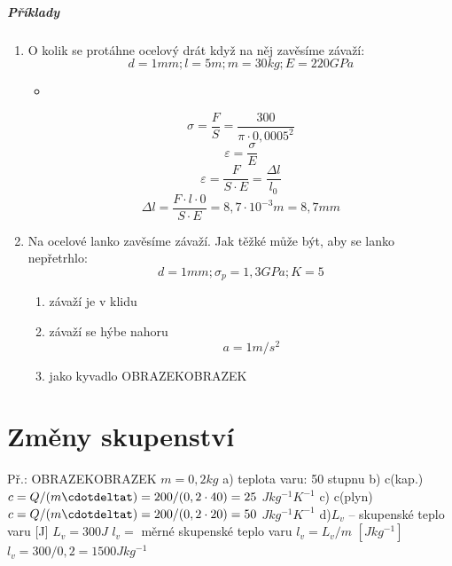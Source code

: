 \documentclass{article}
\begin{document}
        \subsubsection{Příklady}
        \begin{enumerate}
          \item O kolik se protáhne ocelový drát když na něj zavěsíme závaží:
          \begin{equation*}
            d = 1 mm;
            l = 5 m;
            m = 30 kg;
            E = 220 GPa
          \end{equation*}
          \begin{itemize}
            \item[]
          \end{itemize}
          \begin{equation*}
            \sigma=\frac{F}{S}=\frac{300}{\pi\cdot0,0005^2}
          \end{equation*}
          \begin{equation*}
            \varepsilon = \frac{\sigma}{E}
          \end{equation*}
          \begin{equation*}
            \varepsilon = \frac{F}{S\cdot E}=\frac{\Delta l}{l_0}
          \end{equation*}
          \begin{equation*}
            \Delta l = \frac{F\cdot l\cdot 0}{S\cdot E}=8,7\cdot 10^{-3} m = 8,7 mm
          \end{equation*}
          \item Na ocelové lanko zavěsíme závaží. Jak těžké může být, aby se lanko nepřetrhlo:
          \begin{equation*}
            d = 1 mm;
            \sigma_p = 1,3 GPa;
            K = 5
          \end{equation*}
          \begin{enumerate}
            \item závaží je v klidu
            \item závaží se hýbe nahoru
            \begin{equation*}
              a = 1 m/s^2
            \end{equation*}
            \item jako kyvadlo OBRAZEKOBRAZEK
          \end{enumerate}
        \end{enumerate}

\part{Změny skupenství}
Př.: OBRAZEKOBRAZEK
$m = 0,2 kg$
a) teplota varu: 50 stupnu
b) c(kap.) $c = Q/(m\cdotdeltat)=200/(0,2\cdot 40) = 25$ $Jkg^{-1}K^{-1}$
c) c(plyn) $c = Q/(m\cdotdeltat)=200/(0,2\cdot 20) = 50$ $Jkg^{-1}K^{-1}$
d)$L_v$ -- skupenské teplo varu [J]
$L_v = 300 J$
$l_v = $ měrné skupenské teplo varu $l_v = L_v/m$ $[Jkg^{-1}]$
$l_v = 300/0,2 = 1500 Jkg^{-1}$
\end{document}
